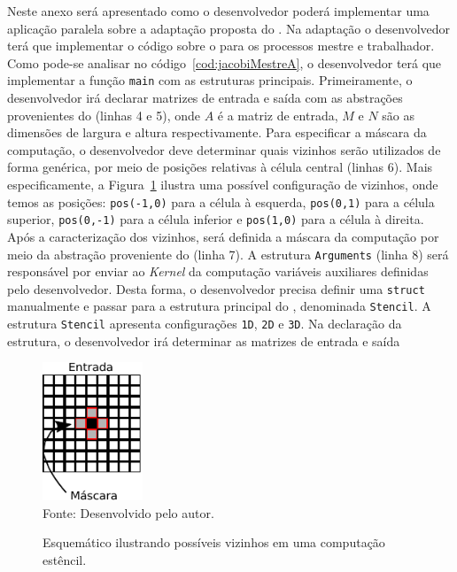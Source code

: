 Neste anexo será apresentado como o desenvolvedor poderá implementar uma
aplicação paralela sobre a adaptação proposta do \fw \pskel. Na adaptação o desenvolvedor
terá que implementar o código sobre o \fw \pskel para os processos mestre e
trabalhador. Como pode-se analisar no código~\ref{cod:jacobiMestreA}, o
desenvolvedor terá que implementar a função \texttt{main} com as estruturas
principais. Primeiramente, o desenvolvedor irá declarar matrizes de
entrada e saída com as abstrações provenientes do \fw (linhas 4 e 5), onde $A$ é
a matriz de entrada, $M$ e $N$ são as dimensões de largura e altura
respectivamente. Para especificar a máscara da computação, o desenvolvedor deve determinar quais
vizinhos serão utilizados de forma genérica, por meio de posições relativas à
célula central (linhas 6). Mais especificamente, a Figura~\ref{fig:stencilA} ilustra uma
possível configuração de vizinhos, onde temos as posições: \texttt{pos(-1,0)}
para a célula à esquerda, \texttt{pos(0,1)} para a célula superior,
\texttt{pos(0,-1)} para a célula inferior e \texttt{pos(1,0)} para a célula à
direita. Após a caracterização dos vizinhos, será definida a máscara da
computação por meio da abstração proveniente do \fw (linha 7). A estrutura
\texttt{Arguments} (linha 8) será responsável por enviar ao \textit{Kernel} da
computação variáveis auxiliares definidas pelo desenvolvedor. Desta forma, o
desenvolvedor precisa definir uma \texttt{struct} manualmente e passar para a estrutura
principal do \fw, denominada \texttt{Stencil}. A estrutura \texttt{Stencil}
apresenta configurações \texttt{1D}, \texttt{2D} e \texttt{3D}. Na declaração da
estrutura, o desenvolvedor irá determinar as matrizes de entrada e saída

\begin{figure}[!h]
    \centering
    \caption{Esquemático ilustrando possíveis vizinhos em uma computação estêncil.}
    \includegraphics[width=3cm]{figs/vizinhosAnexo.pdf} \\
    Fonte: Desenvolvido pelo autor.
    \label{fig:stencilA}
\end{figure}

